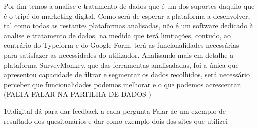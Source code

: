 Por fim temos a analise e tratamento de dados que é um dos suportes daquilo que é o tripé do marketing digital. Como será de esperar a plataforma a desenvolver, tal como todas as restantes plataformas analisadas, não é um software dedicado à analise e tratamento de dados, na medida que terá limitações, contudo, ao contrário do Typeform e do Google Form, terá as funcionalidades necessárias para satisfazer as necessidades do utilizador. Analisando mais em detalhe a plataforma SurveyMonkey, que das ferramentas analisadadas, foi a única que apresentou capacidade de filtrar e segmentar os dados recolhidos, será necessário perceber que funcionalidades podemos melhorar e o que podemos acrescentar. (FALTA FALAR NA PARTILHA DE DADOS )

10.digital dá para dar feedback a cada pergunta
Falar de um exemplo de resultado dos quesitonários e dar como exemplo dois dos sites que utilizei

